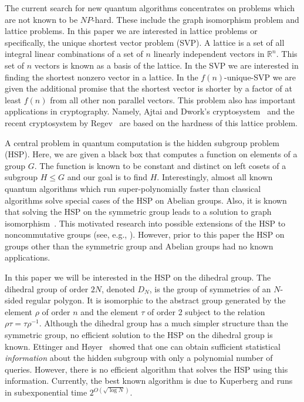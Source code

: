 \documentclass[11pt]{article}
\def\R{\mathbb{R}}
\begin{document}
The current search for new quantum algorithms concentrates on problems which are not known to be $NP$-hard. These
include the graph isomorphism problem and lattice problems. In this paper we are interested in lattice problems or
specifically, the unique shortest vector problem (SVP). A lattice is a set of all integral linear combinations of a set
of $n$ linearly independent vectors in $\R^n$. This set of $n$ vectors is known as a basis of the lattice. In the SVP
we are interested in finding the shortest nonzero vector in a lattice. In the $f(n)$-unique-SVP we are given the
additional promise that the shortest vector is shorter by a factor of at least $f(n)$ from all other non parallel
vectors. This problem also has important applications in cryptography. Namely, Ajtai and Dwork's
cryptosystem~\cite{AjtaiDwork} and the recent cryptosystem by Regev~\cite{RegevPKE} are based on the hardness of this
lattice problem.

A central problem in quantum computation is the hidden subgroup problem (HSP). Here, we are given a black box that
computes a function on elements of a group $G$. The function is known to be constant and distinct on left cosets of a
subgroup $H\leqslant G$ and our goal is to find $H$. Interestingly, almost all known quantum algorithms which run
super-polynomially faster than classical algorithms solve special cases of the HSP on Abelian groups. Also, it is known
that solving the HSP on the symmetric group leads to a solution to graph isomorphism~\cite{KoblerGraphIsomorphism}.
This motivated research into possible extensions of the HSP to noncommutative groups (see, e.g.,
\cite{GrigniSchulman01,HallgrenTashma00,RottelerWreathGroup,SanthaHiddenTranslation}). However, prior to this paper the
HSP on groups other than the symmetric group and Abelian groups had no known applications.

In this paper we will be interested in the HSP on the dihedral group. The dihedral group of order $2N$, denoted $D_N$,
is the group of symmetries of an $N$-sided regular polygon. It is isomorphic to the abstract group generated by the
element $\rho$ of order $n$ and the element $\tau$ of order 2 subject to the relation $\rho\tau = \tau \rho^{-1}$.
Although the dihedral group has a much simpler structure than the symmetric group, no efficient solution to the HSP on
the dihedral group is known. Ettinger and H{\o}yer~\cite{EttingerHoyerDihedral} showed that one can obtain sufficient
statistical {\em information} about the hidden subgroup with only a polynomial number of queries. However, there is no
efficient algorithm that solves the HSP using this information. Currently, the best known algorithm is due to Kuperberg
\cite{Kuperberg} and runs in subexponential time $2^{O(\sqrt{\log{N}})}$.
\end{document}
